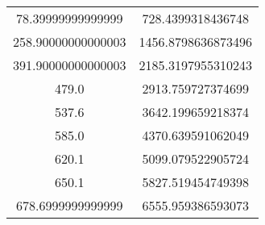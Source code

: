 \begin{table}
\begin{tabular}{S[]S[]}
78.39999999999999 & 728.4399318436748\\
258.90000000000003 & 1456.8798636873496\\
391.90000000000003 & 2185.3197955310243\\
479.0 & 2913.759727374699\\
537.6 & 3642.199659218374\\
585.0 & 4370.639591062049\\
620.1 & 5099.079522905724\\
650.1 & 5827.519454749398\\
678.6999999999999 & 6555.959386593073\\
\bottomrule
\end{tabular}\end{table}